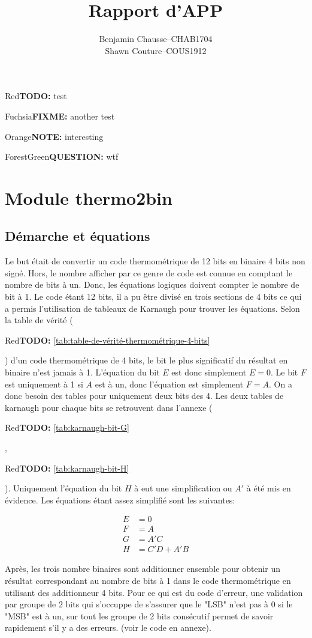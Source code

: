 \documentclass[a11paper]{article}
\title{Rapport d'APP}
\author{
  \addtolength{\tabcolsep}{-0.4em}
  \begin{tabular}{rcl} %
      Benjamin Chausse & -- & CHAB1704 \\
      Shawn Couture    & -- & COUS1912 \\
  \end{tabular}
}
\newcommand{\todo}[1]{\begin{color}{Red}\textbf{TODO:} #1\end{color}}
\newcommand{\note}[1]{\begin{color}{Orange}\textbf{NOTE:} #1\end{color}}
\newcommand{\fixme}[1]{\begin{color}{Fuchsia}\textbf{FIXME:} #1\end{color}}
\newcommand{\question}[1]{\begin{color}{ForestGreen}\textbf{QUESTION:} #1\end{color}}
\begin{document}
\maketitle
\newpage
\tableofcontents
\newpage

\todo{test} \fixme{another test} \note{interesting} \question{wtf}

\section{Module thermo2bin}

\subsection{Démarche et équations}
Le but était de convertir un code thermométrique de 12 bits en binaire 4 bits non signé. Hors, le nombre afficher par ce genre de code
est connue en comptant le nombre de bits à un. Donc, les équations logiques doivent compter le nombre de bit à 1. Le code étant 12 bits,
il a pu être divisé en trois sections de 4 bits ce qui a permis l'utilisation de tableaux de Karnaugh pour trouver les équations. Selon
la table de vérité (\todo{\ref{tab:table-de-vérité-thermométrique-4-bits}}) d'un code thermométrique de 4 bits, le bit le plus significatif
du résultat en binaire n'est jamais à 1. L'équation du bit $E$ est donc simplement $E=0$. Le bit $F$ est uniquement à 1 si $A$ est à un, donc
l'équation est simplement $F=A$. On a donc besoin des tables pour uniquement deux bits des 4. Les deux tables de karnaugh pour chaque bits
se retrouvent dans l'annexe (\todo{\ref{tab:karnaugh-bit-G}}, \todo{\ref{tab:karnaugh-bit-H}}). Uniquement l'équation du bit $H$ à eut une
simplification ou $A'$ à été mis en évidence. Les équations étant assez simplifié sont les suivantes:

\begin{align}
  E &= 0 \\ F &= A \\ G &= A'C \\ H &= C'D+A'B
\end{align}

Après, les trois nombre binaires sont additionner ensemble pour obtenir un résultat correspondant au nombre de bits à 1 dans le code
thermométrique en utilisant des additionneur 4 bits. Pour ce qui est du code d'erreur, une validation par groupe de 2 bits qui s'occuppe
de s'assurer que le "LSB" n'est pas à 0 si le "MSB" est à un, sur tout les groupe de 2 bits consécutif permet de savoir rapidement s'il
y a des erreurs. (voir le code en annexe).
\end{document}
